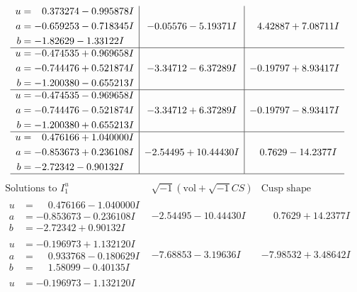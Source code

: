 \documentclass[1p]{elsarticle_modified}
\theoremstyle{definition}
\newcommand{\I}{\sqrt{-1}}
\begin{document}
$$\begin{array}{c|c|c}
\begin{aligned}
u &= \phantom{-}0.373274 - 0.995878 I \\
a &= -0.659253 - 0.718345 I \\
b &= -1.82629 - 1.33122 I\end{aligned}
 & -0.05576 - 5.19371 I & \phantom{-}4.42887 + 7.08711 I \\ \hline\begin{aligned}
u &= -0.474535 + 0.969658 I \\
a &= -0.744476 + 0.521874 I \\
b &= -1.200380 - 0.655213 I\end{aligned}
 & -3.34712 - 6.37289 I & -0.19797 + 8.93417 I \\ \hline\begin{aligned}
u &= -0.474535 - 0.969658 I \\
a &= -0.744476 - 0.521874 I \\
b &= -1.200380 + 0.655213 I\end{aligned}
 & -3.34712 + 6.37289 I & -0.19797 - 8.93417 I \\ \hline\begin{aligned}
u &= \phantom{-}0.476166 + 1.040000 I \\
a &= -0.853673 + 0.236108 I \\
b &= -2.72342 - 0.90132 I\end{aligned}
 & -2.54495 + 10.44430 I & \phantom{-}0.7629 - 14.2377 I\\
 \hline 
 \end{array}$$\newpage$$\begin{array}{c|c|c}  
\text{Solutions to }I^u_{1}& \I (\text{vol} + \sqrt{-1}CS) & \text{Cusp shape}\\
 \hline 
\begin{aligned}
u &= \phantom{-}0.476166 - 1.040000 I \\
a &= -0.853673 - 0.236108 I \\
b &= -2.72342 + 0.90132 I\end{aligned}
 & -2.54495 - 10.44430 I & \phantom{-}0.7629 + 14.2377 I \\ \hline\begin{aligned}
u &= -0.196973 + 1.132120 I \\
a &= \phantom{-}0.933768 - 0.180629 I \\
b &= \phantom{-}1.58099 - 0.40135 I\end{aligned}
 & -7.68853 - 3.19636 I & -7.98532 + 3.48642 I \\ \hline\begin{aligned}
u &= -0.196973 - 1.132120 I \\

\end{aligned}
\end{array}$$
\end{document}

